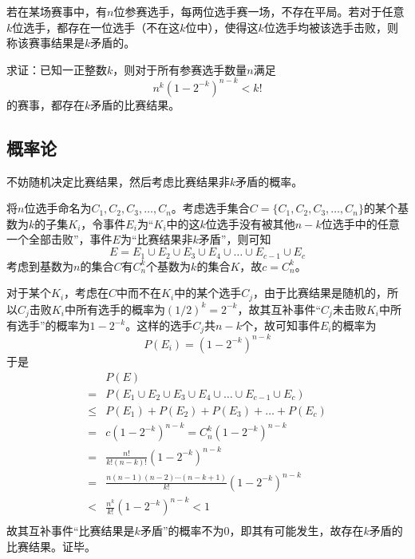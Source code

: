 

若在某场赛事中，有$n$位参赛选手，每两位选手赛一场，不存在平局。若对于任意$k$位选手，都存在一位选手（不在这$k$位中），使得这$k$位选手均被该选手击败，则称该赛事结果是$k$矛盾的。

求证：已知一正整数$k$，则对于所有参赛选手数量$n$满足
\[ n^k\left(1 - 2^{-k}\right)^{n - k} < k! \]
的赛事，都存在$k$矛盾的比赛结果。

\subsection{概率论}

不妨随机决定比赛结果，然后考虑比赛结果非$k$矛盾的概率。

将$n$位选手命名为$C_1, C_2, C_3, \dots, C_n$。考虑选手集合$C = \{C_1, C_2, C_3, \dots, C_n\}$的某个基数为$k$的子集$K_i$，令事件$E_i$为“$K_i$中的这$k$位选手没有被其他$n - k$位选手中的任意一个全部击败”，事件$E$为“比赛结果非$k$矛盾”，则可知
\[ E = E_1 \cup E_2 \cup E_3 \cup E_4 \cup \dots \cup E_{c - 1} \cup E_c \]
考虑到基数为$n$的集合$C$有$C_n^k$个基数为$k$的集合$K$，故$c = C_n^k$。

对于某个$K_i$，考虑在$C$中而不在$K_i$中的某个选手$C_j$，由于比赛结果是随机的，所以$C_j$击败$K_i$中所有选手的概率为$(1/2)^k = 2^{-k}$，故其互补事件“$C_j$未击败$K_i$中所有选手”的概率为$1 - 2^{-k}$。这样的选手$C_j$共$n - k$个，故可知事件$E_i$的概率为
\[ P(E_i) = \left(1 - 2^{-k}\right)^{n - k} \]
于是
\begin{align*}
  & P(E) \\
  ={}& P(E_1 \cup E_2 \cup E_3 \cup E_4 \cup \dots \cup E_{c - 1} \cup E_c) \\
  \le{}& P(E_1) + P(E_2) + P(E_3) + \dots + P(E_c) \\
  ={}& c\left(1 - 2^{-k}\right)^{n - k} = C_n^k\left(1 - 2^{-k}\right)^{n - k} \\
  ={}& \frac{n!}{k!(n - k)!}\left(1 - 2^{-k}\right)^{n - k} \\
  ={}& \frac{n(n - 1)(n - 2)\cdots(n - k + 1)}{k!}\left(1 - 2^{-k}\right)^{n - k} \\
  <{}& \frac{n^k}{k!}\left(1 - 2^{-k}\right)^{n - k} < 1 \\
\end{align*}
故其互补事件“比赛结果是$k$矛盾”的概率不为0，即其有可能发生，故存在$k$矛盾的比赛结果。证毕。
